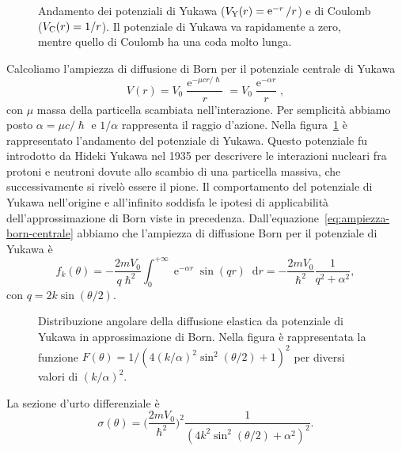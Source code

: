 \documentclass[a4paper,fleqn,twoside,12pt]{article}
\newcommand*{\dd}{\mathop{}\!\mathrm{d}} %
\DeclareMathOperator{\e}{\mathrm{e}} %
\begin{document}
\begin{figure}
  \centering
  
  \caption{Andamento dei potenziali di Yukawa ($V_{\textup{Y}}(r) = \e^{-r}/r$)
    e di Coulomb ($V_{\textup{C}}(r)=1/r$).  Il potenziale di Yukawa va
    rapidamente a zero, mentre quello di Coulomb ha una coda molto lunga.}
  \label{fig:pot-yukawa}
\end{figure}
Calcoliamo l'ampiezza di diffusione di Born per il potenziale centrale di Yukawa
\begin{equation}
  V(r) = V_{0}\frac{\e^{-\mu cr/\hslash}}{r} = V_{0}\frac{\e^{-\alpha r}}{r},
\end{equation}
con $\mu$ massa della particella scambiata nell'interazione.  Per semplicità
abbiamo posto $\alpha = \mu c/\hslash$ e $1/\alpha$ rappresenta il raggio
d'azione.  Nella figura~\ref{fig:pot-yukawa} è rappresentato l'andamento del
potenziale di Yukawa.  Questo potenziale fu introdotto da Hideki Yukawa nel 1935
per descrivere le interazioni nucleari fra protoni e neutroni dovute allo
scambio di una particella massiva, che successivamente si rivelò essere il
pione.
Il comportamento del potenziale di Yukawa nell'origine e all'infinito soddisfa
le ipotesi di applicabilità dell'approssimazione di Born viste in precedenza.
Dall'equazione~\eqref{eq:ampiezza-born-centrale} abbiamo che l'ampiezza di
diffusione Born per il potenziale di Yukawa è
\begin{equation}
  f_{k}(\theta) = -\frac{2mV_{0}}{q\hslash^{2}} \int_{0}^{+\infty} \e^{-\alpha
    r}\sin(qr)\dd r = -\frac{2mV_{0}}{\hslash^{2}} \frac{1}{q^{2} + \alpha^{2}},
\end{equation}
con $q = 2k\sin(\theta/2)$.
\begin{figure}
  \centering
  
  \caption{Distribuzione angolare della diffusione elastica da potenziale di
    Yukawa in approssimazione di Born.  Nella figura è rappresentata la funzione
    $F(\theta) = 1/(4(k/\alpha)^{2}\sin^{2}(\theta/2)+1)^{2}$ per diversi valori
    di $(k/\alpha)^{2}$.}
  \label{fig:sez-urto-yukawa}
\end{figure}
La sezione d'urto differenziale è
\begin{equation}
  \label{eq:sezione-yukawa}
  \sigma(\theta) = \bigg(\frac{2mV_{0}}{\hslash^{2}}\bigg)^{2}
  \frac{1}{(4k^{2}\sin^{2}(\theta/2) + \alpha^{2})^{2}}.
\end{equation}
\end{document}
